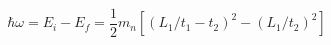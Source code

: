 \documentclass[paper=a4, fontsize=11pt]{scrartcl}	%
\numberwithin{equation}{section}															%
\numberwithin{figure}{section}																%
\numberwithin{table}{section}																%
\begin{document}
\begin{equation*}
\hbar\omega = E_i - E_f = \frac{1}{2}m_n[(L_1 / t_1-t_2)^2 - (L_1/t_2)^2]
\end{equation*}

%
\end{document}
